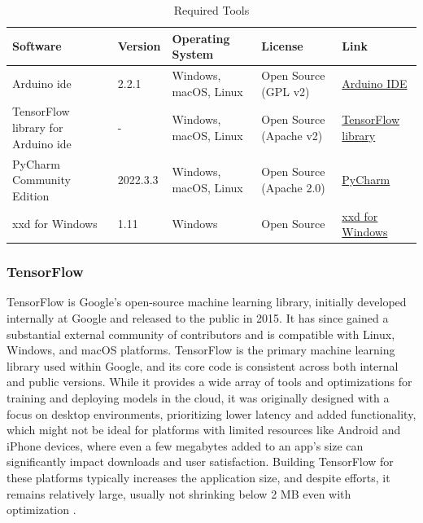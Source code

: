 \begin{table}[H]
	\centering
	\begin{tabular}{p{3cm}|p{1.5cm}|p{2cm}|p{2.5cm}|p{2cm}}
		\hline
		\textbf{Software} & \textbf{Version} & \textbf{Operating System} & \textbf{License} & \textbf{Link} \\
		\hline
		Arduino \ac{ide} & 2.2.1 & Windows, macOS, Linux & Open Source (GPL v2) & \href{https://www.arduino.cc/en/software}{Arduino IDE} \\
		\hline
		TensorFlow library for Arduino \ac{ide} & - & Windows, macOS, Linux & Open Source (Apache v2) & \href{https://github.com/tensorflow/tflite-micro-arduino-examples}{TensorFlow library} \\
		\hline
		PyCharm Community Edition & 2022.3.3 & Windows, macOS, Linux & Open Source (Apache 2.0) & \href{https://www.jetbrains.com/pycharm/}{PyCharm} \\
		\hline
		xxd for Windows & 1.11 & Windows & Open Source & \href{https://sourceforge.net/projects/xxd-for-windows/}{xxd for Windows} \\
		\hline
	\end{tabular}
	\caption{Required Tools}
	\label{table:ProgramBOM}
\end{table}

\subsubsection{TensorFlow}

TensorFlow is Google's open-source machine learning library, initially developed internally at Google and released to the public in 2015. It has since gained a substantial external community of contributors and is compatible with Linux, Windows, and macOS platforms. TensorFlow is the primary machine learning library used within Google, and its core code is consistent across both internal and public versions. While it provides a wide array of tools and optimizations for training and deploying models in the cloud, it was originally designed with a focus on desktop environments, prioritizing lower latency and added functionality, which might not be ideal for platforms with limited resources like Android and iPhone devices, where even a few megabytes added to an app's size can significantly impact downloads and user satisfaction. Building TensorFlow for these platforms typically increases the application size, and despite efforts, it remains relatively large, usually not shrinking below 2 MB even with optimization \cite{Warden:2019}.

